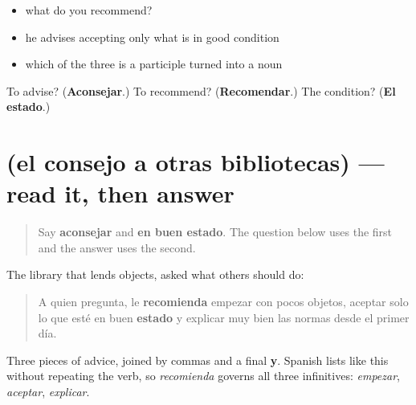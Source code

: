 \begin{itemize}
\raggedright
  \item what do you recommend?
  \item he advises accepting only what is in good condition
  \item which of the three is a participle turned into a noun
\end{itemize}

\begin{tcolorbox}[breakable,colback=teal!4,colframe=teal!35!black,title={Before you move on}]
To advise? (\textbf{Aconsejar}.) To recommend? (\textbf{Recomendar}.) The condition? (\textbf{El estado}.)
\end{tcolorbox}
\section[Practice]{(el consejo a otras bibliotecas) — read it, then answer}

\label{lesson:ES-C473-sintesis-consejo}



\begin{quote}
Say \textbf{aconsejar} and \textbf{en buen estado}. The question below uses the first and the answer uses the second.
\end{quote}

\begin{tcolorbox}[breakable,skin=enhanced,colback=orange!6,colframe=orange!45!black,boxrule=0.5pt,arc=1mm,left=6pt,right=6pt,top=4pt,bottom=4pt,fonttitle=\bfseries,title={Read this}]
The library that lends objects, asked what others should do:

\begin{quote}
A quien pregunta, le \textbf{recomienda} empezar con pocos objetos, aceptar solo lo que esté en buen \textbf{estado} y explicar muy bien las normas desde el primer día.
\end{quote}

Three pieces of advice, joined by commas and a final \textbf{y}. Spanish lists like this without repeating the verb, so \emph{recomienda} governs all three infinitives: \emph{empezar}, \emph{aceptar}, \emph{explicar}.
\end{tcolorbox}

